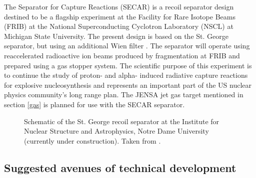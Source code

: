 The Separator for Capture Reactions (SECAR) is a recoil separator design destined to be a flagship experiment at the Facility for Rare Isotope Beams (FRIB)  at the National Superconducting Cyclotron Laboratory (NSCL) at Michigan State University. The present design is based on the St. George separator, but using an additional Wien filter \cite{ber10}. The separator will operate using reaccelerated radioactive ion beams produced by fragmentation at FRIB and prepared using a gas stopper system. The scientific purpose of this experiment is to continue the study of proton- and alpha- induced radiative capture reactions for explosive nucleosynthesis and represents an important part of the US nuclear physics community's long range plan. The JENSA jet gas target mentioned in section \ref{gas} \cite{chi13} is planned for use with the SECAR separator. 
\begin{figure}
\begin{center}
\caption{Schematic of the St. George recoil separator at the Institute for Nuclear Structure and Astrophysics, Notre Dame University (currently under construction). Taken from \cite{cou08}.}
\label{fig:stgeorge}
\end{center}
\end{figure}

\subsection{Suggested avenues of technical development} 

